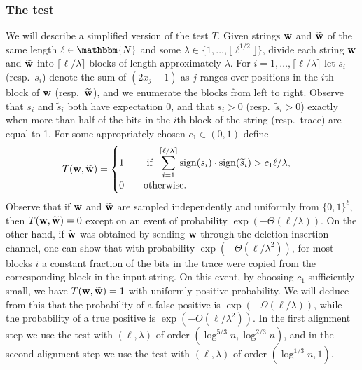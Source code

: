 \documentclass[final,12pt]{colt2018} %
\newcommand{\N}{\mathbbm{N}}
\newcommand{\1}{\mathbf{1}}
\newcommand{\eqb}{\begin{equation}}
\newcommand{\eqe}{\end{equation}}
\newcommand{\op}{\operatorname}
\newcommand{\wt}{\widetilde}
\def\w{{\bf w}}
\begin{document}
\subsubsection*{The test}
We will describe a simplified version of the test $T$. Given strings $\w$ and $\wt\w$ of the same length $\ell\in\N$ and some $\lambda\in\{1,\dots,\lfloor \ell^{1/2} \rfloor \}$, divide each string $\w$ and $\wt\w$ into $\lceil\ell/\lambda \rceil$ blocks of length approximately $\lambda$. For $i=1,\dots,\lceil\ell/\lambda\rceil$ let $s_i$ (resp.\ $\wt s_i$) denote the sum of
$(2x_j - 1)$ as $j$ ranges over positions in the $i$th block of
$\w$ (resp.\ $\wt\w$), and we enumerate the blocks from left to right.
Observe that $s_i$ and $\wt s_i$ both have expectation 0, and that $s_i>0$
(resp.\ $\wt s_i>0$) exactly when more than half of the bits in the $i$th
block of the string (resp.\ trace) are equal to 1. For some appropriately chosen $c_1\in(0,1)$ define
\eqb
T(\w,\wt\w) =
\begin{cases}
	1\qquad \displaystyle \text{\,\,if\,\,\,}\sum_{i=1}^{\lceil\ell/\lambda\rceil} \op{sign}(s_i)\cdot\op{sign}(\wt s_i) >  c_1 \ell/\lambda,\\
	0\qquad\text{otherwise}.
\end{cases}
\label{eq15}
\eqe
Observe that if $\w$ and $\wt\w$ are sampled independently and uniformly from $\{0,1 \}^\ell$, then $T(\w,\wt\w)=0$ except on an event of probability $\exp(-\Theta(\ell/\lambda ))$. On the other hand, if $\wt\w$ was obtained by sending $\w$ through the deletion-insertion channel, one can show that with probability $\exp(-\Theta(\ell/\lambda^2 ))$, for most blocks $i$ a constant fraction of the bits in the trace were copied from the corresponding block in the input string. On this event, by choosing $c_1$ sufficiently small, we have $T(\w,\wt\w)=1$ with uniformly positive probability. We will deduce from this that the probability of a false positive is $\exp(-\Omega(\ell/\lambda))$, while the probability of a true positive is $\exp(-O(\ell/\lambda^2 ))$. In the first alignment step we use the test with $(\ell,\lambda)$ of order $(\log^{5/3}n,\log^{2/3}n)$, and in the second alignment step we use the test with $(\ell,\lambda)$ of order $(\log^{1/3}n,1)$.
\end{document}
